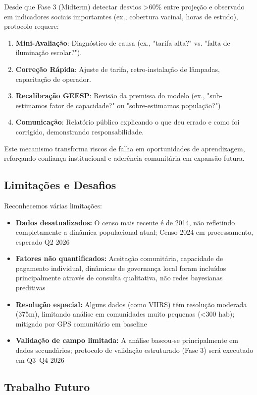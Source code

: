 \documentclass[12pt, a4paper]{article}
\begin{document}
Desde que Fase 3 (Midterm) detectar desvios >60\% entre projeção e observado em indicadores sociais importamtes (ex., cobertura vacinal, horas de estudo), protocolo requere:

\begin{enumerate}
\item \textbf{Mini-Avaliação}: Diagnóstico de causa (ex., "tarifa alta?" vs. "falta de iluminação escolar?").
\item \textbf{Correção Rápida}: Ajuste de tarifa, retro-instalação de lâmpadas, capacitação de operador.
\item \textbf{Recalibração GEESP}: Revisão da premissa do modelo (ex., "sub-estimamos fator de capacidade?" ou "sobre-estimamos população?")
\item \textbf{Comunicação}: Relatório público explicando o que deu errado e como foi corrigido, demonstrando responsabilidade.
\end{enumerate}

Este mecanismo transforma riscos de falha em oportunidades de aprendizagem, reforçando confiança institucional e aderência comunitária em expansão futura.

\subsection{Limitações e Desafios}

Reconhecemos várias limitações:
\begin{itemize}
    \item \textbf{Dados desatualizados:} O censo mais recente é de 2014, não refletindo completamente a dinâmica populacional atual; Censo 2024 em processamento, esperado Q2 2026
    \item \textbf{Fatores não quantificados:} Aceitação comunitária, capacidade de pagamento individual, dinâmicas de governança local foram incluídos principalmente através de consulta qualitativa, não redes bayesianas preditivas
    \item \textbf{Resolução espacial:} Alguns dados (como VIIRS) têm resolução moderada (375m), limitando análise em comunidades muito pequenas (<300 hab); mitigado por GPS comunitário em baseline
    \item \textbf{Validação de campo limitada:} A análise baseou-se principalmente em dados secundários; protocolo de validação estruturado (Fase 3) será executado em Q3--Q4 2026
\end{itemize}

\subsection{Trabalho Futuro}
\end{document}
